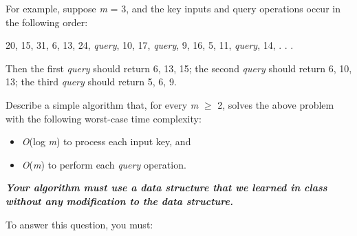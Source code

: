 \documentclass[11pt]{article}
\begin{document}
\noindent
For example, suppose \textit{m} = 3, and the key inputs and query operations occur in the following order:

\begin{center}
20, 15, 31, 6, 13, 24, \textit{query}, 10, 17, \textit{query}, 9, 16, 5, 11, \textit{query}, 14, . . .
\end{center}

\noindent
Then the first \textit{query} should return 6, 13, 15; the second \textit{query} should return 6, 10, 13; the third \textit{query}
should return 5, 6, 9.

\noindent
Describe a simple algorithm that, for every \textit{m} $\geq$ 2, solves the above problem with the following worst-case
time complexity:

\begin{itemize}
  \item \textit{O}(log \textit{m}) to process each input key, and
  \item \textit{O}(\textit{m}) to perform each \textit{query} operation.
\end{itemize}



\noindent
\textit{\textbf{Your algorithm must use a data structure that we learned in class without any modification
to the data structure.}}

\noindent
To answer this question, you must:
\end{document}
